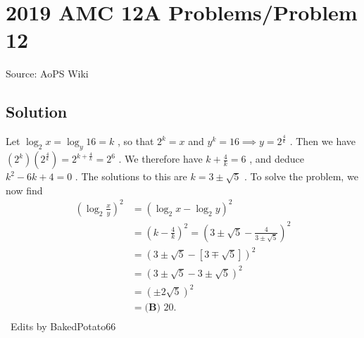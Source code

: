 \documentclass[12pt]{article}
\begin{document}
\section*{{2019 AMC 12A Problems/Problem 12}}
Source: AoPS Wiki

\subsection*{Solution}
Let $\log_2{x} = \log_y{16}=k$ , so that $2^k=x$ and $y^k=16 \implies y=2^{\frac{4}{k}}$ . Then we have $(2^k)(2^{\frac{4}{k}})=2^{k+\frac{4}{k}}=2^6$ . We therefore have $k+\frac{4}{k}=6$ , and deduce $k^2-6k+4=0$ . The solutions to this are $k = 3 \pm \sqrt{5}$ . To solve the problem, we now find \begin{align*} (\log_2\tfrac{x}{y})^2&=(\log_2 x - \log_2 y)^2\\ &=(k-\tfrac{4}{k})^2=(3 \pm \sqrt{5} - \tfrac{4}{3 \pm \sqrt{5}})^2 \\ &= (3 \pm \sqrt{5} - [3 \mp \sqrt{5}])^2\\ &= (3 \pm \sqrt{5} - 3 \pm \sqrt{5})^2\\ &=(\pm 2\sqrt{5})^2 \\ &= \boxed{\textbf{(B) } 20}. \\ \end{align*} ~Edits by BakedPotato66
\end{document}
